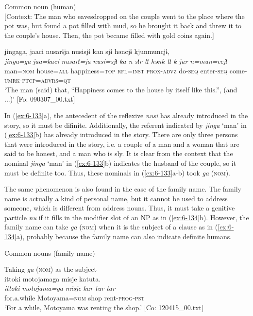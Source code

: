\begin{styleBeschriftung}
\ex Common noun (human)\\{}
[Context: The man who eavesdropped on the couple went to the place where the pot was, but found a pot filled with mud, so he brought it back and threw it to the couple’s house. Then, the pot became filled with gold coins again.]

{\TM}
\glll jingaga,  jaaci  nusarɨja  nusisjɨ  kan   sjɨ  həncjɨ  kjunmuncjɨ,\\
      \textit{jinga=ga}  \textit{jaa=kaci}  \textit{nusarɨ=ja}  \textit{nusi=sjɨ}  \textit{ka-n}      \textit{sɨr-tɨ}  \textit{hənk-tɨ}  \textit{k-jur-n=mun=ccjɨ}\\
      man=\textsc{nom}  house=\textsc{all}  happiness=\textsc{top}  \textsc{rfl}=\textsc{inst}  \textsc{prox}-\textsc{advz}      do-\textsc{seq}  enter-\textsc{seq}  come-\textsc{umrk}-\textsc{ptcp}=\textsc{advrs}=\textsc{qt}\\
\glt ‘The man (said) that, “Happiness comes to the house by itself like this.”, (and ...)’ [Fo: 090307\_00.txt]
\z

In (\ref{ex:6-133}a), the antecedent of the reflexive \textit{nusi} has already introduced in the story, so it must be difinite. Additionally, the referent indicated by \textit{jinga} ‘man’ in (\ref{ex:6-133}b) has already introduced in the story. There are only three persons that were introduced in the story, i.e. a couple of a man and a woman that are said to be honest, and a man who is sly. It is clear from the context that the nominal \textit{jinga} ‘man’ in (\ref{ex:6-133}b) indicates the husband of the couple, so it must be definite too. Thus, these nominals in (\ref{ex:6-133}a-b) took \textit{ga} (\textsc{nom}).

The same phenomenon is also found in the case of the family name. The family name is actually a kind of personal name, but it cannot be used to address someone, which is different from address nouns. Thus, it must take a genitive particle \textit{nu} if it fills in the modifier slot of an NP as in (\ref{ex:6-134}b). However, the family name can take \textit{ga} (\textsc{nom}) when it is the subject of a clause as in (\ref{ex:6-134}a), probably because the family name can also indicate definite humans.

\ea\label{ex:6-134}
  Common nouns (family name)

 \ea Taking \textit{ga} (\textsc{nom}) as the subject\\
{\TM}
\glll  {\textbar}ittoki{\textbar}  motojamaga  misje  katuta.\\
\textit{ittoki}  \textit{motojama=ga}  \textit{misje}  \textit{kar-tur-tar}\\
for.a.while  Motoyama=\textsc{nom}  shop  rent-\textsc{prog}-\textsc{pst}\\
\glt ‘For a while, Motoyama was renting the shop.’ [Co: 120415\_00.txt]
\z


\end{styleBeschriftung}
